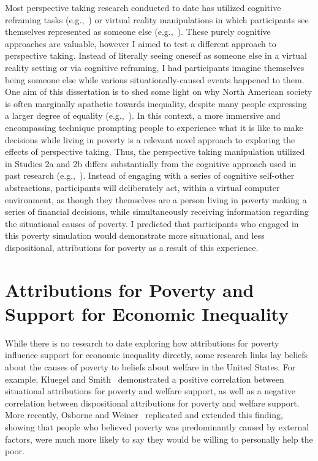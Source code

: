 \documentclass{sfuthesis}
\begin{document}
Most perspective taking research conducted to date has utilized cognitive reframing tasks (e.g.,~\cite{hooper15, taylor75}) or virtual reality manipulations in which participants see themselves represented as someone else (e.g.,~\cite{yee06}). These purely cognitive approaches are valuable, however I aimed to test a different approach to perspective taking. Instead of literally seeing oneself as someone else in a virtual reality setting or via cognitive reframing, I had participants imagine themselves being someone else while various situationally-caused events happened to them. One aim of this dissertation is to shed some light on why North American society is often marginally apathetic towards inequality, despite many people expressing a larger degree of equality (e.g.,~\cite{norton11, kiatpongsan14}). In this context, a more immersive and encompassing technique prompting people to experience what it is like to make decisions while living in poverty is a relevant novel approach to exploring the effects of perspective taking. Thus, the perspective taking manipulation utilized in Studies 2a and 2b differs substantially from the cognitive approach used in past research (e.g.,~\cite{hooper15, storms73, yee06}). Instead of engaging with a series of cognitive self-other abstractions, participants will deliberately act, within a virtual computer environment, as though they themselves are a person living in poverty making a series of financial decisions, while simultaneously receiving information regarding the situational causes of poverty. I predicted that participants who engaged in this poverty simulation would demonstrate more situational, and less dispositional, attributions for poverty as a result of this experience.

\section{Attributions for Poverty and Support for Economic Inequality}

While there is no research to date exploring how attributions for poverty influence support for economic inequality directly, some research links lay beliefs about the causes of poverty to beliefs about welfare in the United States. For example, Kluegel and Smith~\cite{kluegel86} demonstrated a positive correlation between situational attributions for poverty and welfare support, as well as a negative correlation between dispositional attributions for poverty and welfare support. More recently, Osborne and Weiner~\cite{osborne15} replicated and extended this finding, showing that people who believed poverty was predominantly caused by external factors, were much more likely to say they would be willing to personally help the poor.
\end{document}
